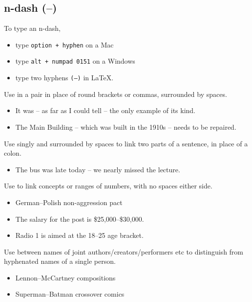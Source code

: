 \documentclass[11pt,a4paper]{book}
\newcommand{\cmark}{{\color{green(html/cssgreen)}\checkmark}}%
\begin{document}
		\subsection{n-dash (--)}
		To type an n-dash,
			\begin{itemize}
				\item type \texttt{option + hyphen} on a Mac
				\item type \texttt{alt + numpad 0151} on a Windows
				\item type two hyphens \texttt{(--)} in {\selectfont \LaTeX}.
			\end{itemize}
		Use in a pair in place of round brackets or commas, surrounded by spaces.
			{\firasans \begin{mdframed}[backgroundcolor=aliceblue] \begin{itemize}[label=\cmark]
				\item It was -- as far as I could tell -- the only example of its kind.
				\item The Main Building -- which was built in the 1910s -- needs to be repaired.
			\end{itemize} \end{mdframed} }
		Use singly and surrounded by spaces to link two parts of a sentence, in place of a colon.
			{\firasans \begin{mdframed}[backgroundcolor=aliceblue] \begin{itemize}[label=\cmark]
				\item The bus was late today -- we nearly missed the lecture.
			\end{itemize} \end{mdframed} }
		Use to link concepts or ranges of numbers, with no spaces either side.
			{\firasans \begin{mdframed}[backgroundcolor=aliceblue] \begin{itemize}[label=\cmark]
				\item German--Polish non-aggression pact
				\item The salary for the post is \$25,000--\$30,000.
				\item Radio 1 is aimed at the 18--25 age bracket.
			\end{itemize} \end{mdframed} }
		Use between names of joint authors/creators/performers etc to distinguish from hyphenated names of a single person.
			{\firasans \begin{mdframed}[backgroundcolor=aliceblue] \begin{itemize}[label=\cmark]
				\item Lennon--McCartney compositions
				\item Superman--Batman crossover comics
			\end{itemize} \end{mdframed} }
\end{document}

